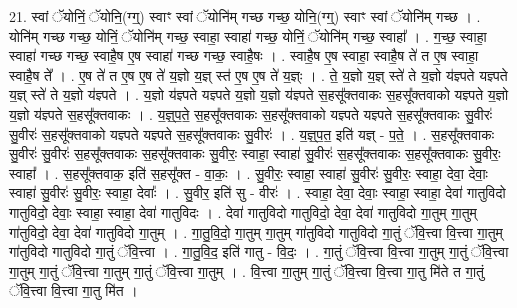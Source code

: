 \documentclass[17pt]{extarticle}
\begin{document}
21. स्वां ॅयोनिं॒ ॅयोनि॒(ग्ग्॒) स्वाꣳ स्वां ॅयोनि॑म् गच्छ गच्छ॒ योनि॒(ग्ग्॒) स्वाꣳ स्वां ॅयोनि॑म् गच्छ । . योनि॑म् गच्छ गच्छ॒ योनिं॒ ॅयोनि॑म् गच्छ॒ स्वाहा॒ स्वाहा॑ गच्छ॒ योनिं॒ ॅयोनि॑म् गच्छ॒ स्वाहा᳚ । . ग॒च्छ॒ स्वाहा॒ स्वाहा॑ गच्छ गच्छ॒ स्वाहै॒ष ए॒ष स्वाहा॑ गच्छ गच्छ॒ स्वाहै॒षः । . स्वाहै॒ष ए॒ष स्वाहा॒ स्वाहै॒ष ते॑ त ए॒ष स्वाहा॒ स्वाहै॒ष ते᳚ । . ए॒ष ते॑ त ए॒ष ए॒ष ते॑ य॒ज्ञो य॒ज्ञ् स्त॑ ए॒ष ए॒ष ते॑ य॒ज्ञ्ः । . ते॒ य॒ज्ञो य॒ज्ञ् स्ते॑ ते य॒ज्ञो य॑ज्ञ्पते यज्ञ्पते य॒ज्ञ् स्ते॑ ते य॒ज्ञो य॑ज्ञ्पते । . य॒ज्ञो य॑ज्ञ्पते यज्ञ्पते य॒ज्ञो य॒ज्ञो य॑ज्ञ्पते स॒हसू᳚क्तवाकः स॒हसू᳚क्तवाको यज्ञ्पते य॒ज्ञो य॒ज्ञो य॑ज्ञ्पते स॒हसू᳚क्तवाकः । . य॒ज्ञ्॒प॒ते॒ स॒हसू᳚क्तवाकः स॒हसू᳚क्तवाको यज्ञ्पते यज्ञ्पते स॒हसू᳚क्तवाकः सु॒वीरः॑ सु॒वीरः॑ स॒हसू᳚क्तवाको यज्ञ्पते यज्ञ्पते स॒हसू᳚क्तवाकः सु॒वीरः॑ । . य॒ज्ञ्॒प॒त॒ इति॑ यज्ञ् - प॒ते॒ । . स॒हसू᳚क्तवाकः सु॒वीरः॑ सु॒वीरः॑ स॒हसू᳚क्तवाकः स॒हसू᳚क्तवाकः सु॒वीरः॒ स्वाहा॒ स्वाहा॑ सु॒वीरः॑ स॒हसू᳚क्तवाकः स॒हसू᳚क्तवाकः सु॒वीरः॒ स्वाहा᳚ । . स॒हसू᳚क्तवाक॒ इति॑ स॒हसू᳚क्त - वा॒कः॒ । . सु॒वीरः॒ स्वाहा॒ स्वाहा॑ सु॒वीरः॑ सु॒वीरः॒ स्वाहा॒ देवा॒ देवाः॒ स्वाहा॑ सु॒वीरः॑ सु॒वीरः॒ स्वाहा॒ देवाः᳚ । . सु॒वीर॒ इति॑ सु - वीरः॑ । . स्वाहा॒ देवा॒ देवाः॒ स्वाहा॒ स्वाहा॒ देवा॑ गातुविदो गातुविदो॒ देवाः॒ स्वाहा॒ स्वाहा॒ देवा॑ गातुविदः । . देवा॑ गातुविदो गातुविदो॒ देवा॒ देवा॑ गातुविदो गा॒तुम् गा॒तुम् गा॑तुविदो॒ देवा॒ देवा॑ गातुविदो गा॒तुम् । . गा॒तु॒वि॒दो॒ गा॒तुम् गा॒तुम् गा॑तुविदो गातुविदो गा॒तुं ॅवि॒त्त्वा वि॒त्त्वा गा॒तुम् गा॑तुविदो गातुविदो गा॒तुं ॅवि॒त्त्वा । . गा॒तु॒वि॒द॒ इति॑ गातु - वि॒दः॒ । . गा॒तुं ॅवि॒त्त्वा वि॒त्त्वा गा॒तुम् गा॒तुं ॅवि॒त्त्वा गा॒तुम् गा॒तुं ॅवि॒त्त्वा गा॒तुम् गा॒तुं ॅवि॒त्त्वा गा॒तुम् । . वि॒त्त्वा गा॒तुम् गा॒तुं ॅवि॒त्त्वा वि॒त्त्वा गा॒तु मि॑ते त गा॒तुं ॅवि॒त्त्वा वि॒त्त्वा गा॒तु मि॑त । \newline
\end{document}
